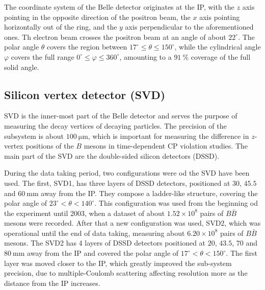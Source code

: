 \documentclass[headings=standardclasses,headings=big,oneside,a4paper,openany,12pt]{scrbook}
\newcommand {\e}[1]{\mathrm{~#1}}
\newcommand {\E}[1]{\times 10^{#1}}
\begin{document}
The coordinate system of the Belle detector originates at the IP, with the $z$ axis pointing in the opposite direction of the positron beam, the $x$ axis pointing horizontally out of the ring, and the $y$ axis perpendicular to the aforementioned ones. Th electron beam crosses the positron beam at an angle of about $22^\circ$. The polar angle $\theta$ covers the region between $17^\circ \leq \theta \leq 150^\circ$, while the cylindrical angle $\varphi$ covers the full range $0^\circ \leq \varphi \leq 360^\circ$, amounting to a $91~\%$ coverage of the full solid angle.




\subsection{Silicon vertex detector (SVD)}
SVD is the inner-most part of the Belle detector and serves the purpose of measuring the decay vertices of decaying particles. The precision of the subsystem is about $100\e{\mu m}$, which is important for measuring the difference in $z$-vertex positions of the $B$ mesons in time-dependent CP violation studies. The main part of the SVD are the double-sided silicon detectors (DSSD).

During the data taking period, two configurations were od the SVD have been used. The first, SVD1, has three layers of DSSD detectors, positioned at $30$, $45.5$ and $60\e{mm}$ away from the IP. They compose a ladder-like structure, covering the polar angle of $23^\circ < \theta < 140^\circ$. This configuration was used from the beginning od the experiment until 2003, when a dataset of about $1.52\E{8}$ pairs of $B \bar B$ mesons were recorded. After that a new configuration was used, SVD2, which was operational until the end of data taking, measuring about $6.20\E{8}$ pairs of $B \bar B$ mesons. The SVD2 has 4 layers of DSSD detectors positioned at $20$, $43.5$, $70$ and $80\e{mm}$ away from the IP and covered the polar angle of $17^\circ < \theta < 150^\circ$. The first layer was moved closer to the IP, which greatly improved the sub-system precision, due to multiple-Coulomb scattering affecting resolution more as the distance from the IP increases.
\end{document}
